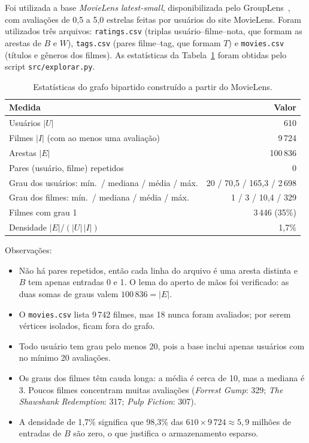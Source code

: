 \documentclass[12pt,a4paper]{article}
\theoremstyle{definition}
\begin{document}
Foi utilizada a base \emph{MovieLens latest-small}, disponibilizada pelo GroupLens~\cite{harper2015}, com avaliações de 0{,}5 a 5{,}0 estrelas feitas
por usuários do site MovieLens. Foram utilizados três arquivos: \texttt{ratings.csv}
(triplas usuário--filme--nota, que formam as arestas de $B$ e $W$),
\texttt{tags.csv} (pares filme--tag, que formam $T$) e \texttt{movies.csv}
(títulos e gêneros dos filmes). As estatísticas da Tabela~\ref{tab:base}
foram obtidas pelo script \texttt{src/explorar.py}.

\begin{table}[ht]
\centering
\begin{tabular}{lr}
\toprule
Medida & Valor \\
\midrule
Usuários $|U|$ & 610 \\
Filmes $|I|$ (com ao menos uma avaliação) & 9\,724 \\
Arestas $|E|$ & 100\,836 \\
Pares (usuário, filme) repetidos & 0 \\
Grau dos usuários: mín.\ / mediana / média / máx. & 20 / 70{,}5 / 165{,}3 / 2\,698 \\
Grau dos filmes: mín.\ / mediana / média / máx. & 1 / 3 / 10{,}4 / 329 \\
Filmes com grau 1 & 3\,446 (35\%) \\
Densidade $|E| / (|U|\,|I|)$ & 1{,}7\% \\
\bottomrule
\end{tabular}
\caption{Estatísticas do grafo bipartido construído a partir do MovieLens.}
\label{tab:base}
\end{table}

Observações:
\begin{itemize}
  \item Não há pares repetidos, então cada linha do arquivo é uma aresta
        distinta e $B$ tem apenas entradas 0 e 1. O lema do aperto de mãos
        foi verificado: as duas somas de graus valem $100\,836 = |E|$.
  \item O \texttt{movies.csv} lista 9\,742 filmes, mas 18 nunca foram
        avaliados; por serem vértices isolados, ficam fora do grafo.
  \item Todo usuário tem grau pelo menos 20, pois a base inclui apenas
        usuários com no mínimo 20 avaliações.
  \item Os graus dos filmes têm cauda longa: a média é cerca de 10, mas a
        mediana é 3. Poucos filmes concentram muitas avaliações
        (\emph{Forrest Gump}: 329; \emph{The Shawshank Redemption}: 317;
        \emph{Pulp Fiction}: 307).
  \item A densidade de 1{,}7\% significa que 98{,}3\% das
        $610 \times 9\,724 \approx 5{,}9$ milhões de entradas de $B$ são
        zero, o que justifica o armazenamento esparso.
\end{itemize}
\end{document}
